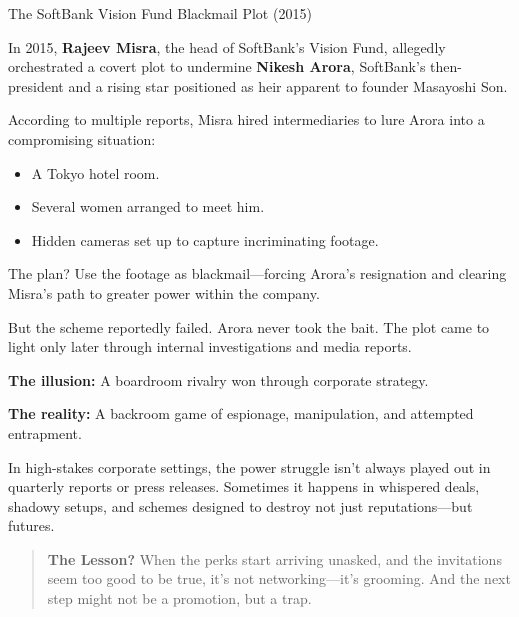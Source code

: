 \begin{HistoricalSidebar}{The SoftBank Vision Fund Blackmail Plot (2015)}

In 2015, \textbf{Rajeev Misra}, the head of SoftBank’s Vision Fund, allegedly orchestrated a covert plot to undermine \textbf{Nikesh Arora}, SoftBank’s then-president and a rising star positioned as heir apparent to founder Masayoshi Son.

\medskip

According to multiple reports, Misra hired intermediaries to lure Arora into a compromising situation:  

\medskip

\begin{itemize}
  \item A Tokyo hotel room.
  \item Several women arranged to meet him.
  \item Hidden cameras set up to capture incriminating footage.
\end{itemize}

The plan?  Use the footage as blackmail—forcing Arora’s resignation and clearing Misra’s path to greater power within the company.

\medskip

But the scheme reportedly failed. Arora never took the bait. The plot came to light only later through internal investigations and media reports.

\medskip

\textbf{The illusion:} A boardroom rivalry won through corporate strategy.

\medskip

\textbf{The reality:} A backroom game of espionage, manipulation, and attempted entrapment.

\medskip

In high-stakes corporate settings, the power struggle isn’t always played out in quarterly reports or press releases. Sometimes it happens in whispered deals, shadowy setups, and schemes designed to destroy not just reputations—but futures.

\medskip

\begin{quote}
\textbf{The Lesson?} When the perks start arriving unasked, and the invitations seem too good to be true, it’s not networking—it’s grooming. And the next step might not be a promotion, but a trap.
\end{quote}

\end{HistoricalSidebar}

